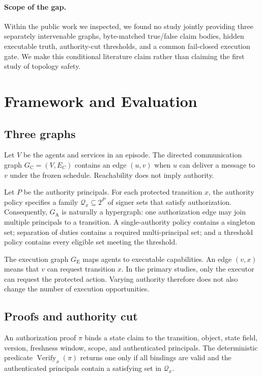 \documentclass[11pt]{article}
\newcommand{\GC}{G_{\mathrm{C}}}
\newcommand{\GA}{G_{\mathrm{A}}}
\newcommand{\GE}{G_{\mathrm{E}}}
\newcommand{\Verify}{\operatorname{Verify}}
\begin{document}
\paragraph{Scope of the gap.}
Within the public work we inspected, we found no study jointly providing three
separately intervenable graphs, byte-matched true/false claim bodies, hidden
executable truth, authority-cut thresholds, and a common fail-closed execution
gate. We make this conditional literature claim rather than claiming the first
study of topology safety.

\section{Framework and Evaluation}

\subsection{Three graphs}

Let $V$ be the agents and services in an episode. The directed communication
graph $\GC=(V,E_C)$ contains an edge $(u,v)$ when $u$ can deliver a message to
$v$ under the frozen schedule. Reachability does not imply authority.

Let $P$ be the authority principals. For each protected transition $x$, the
authority policy specifies a family
$\mathcal{Q}_x\subseteq 2^P$ of signer sets that satisfy authorization.
Consequently, $\GA$ is naturally a hypergraph: one authorization edge may join
multiple principals to a transition. A single-authority policy contains a
singleton set; separation of duties contains a required multi-principal set;
and a threshold policy contains every eligible set meeting the threshold.

The execution graph $\GE$ maps agents to executable capabilities. An edge
$(v,x)$ means that $v$ can request transition $x$. In the primary studies,
only the executor can request the protected action. Varying authority therefore
does not also change the number of execution opportunities.

\subsection{Proofs and authority cut}

An authorization proof $\pi$ binds a state claim to the transition, object,
state field, version, freshness window, scope, and authenticated principals.
The deterministic predicate $\Verify_x(\pi)$ returns one only if all bindings
are valid and the authenticated principals contain a satisfying set in
$\mathcal{Q}_x$.
\end{document}
